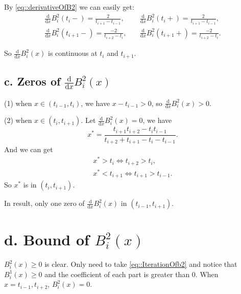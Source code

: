 \documentclass[a4paper]{article}
\begin{document}
By \eqref{eq::derivativeOfB2} we can easily get:
\begin{equation}
    \begin{aligned}
        \frac{\mathrm{d}}{\mathrm{d} x} B_i^2(t_i -) = \frac{2}{t_{i+1} - t_{i-1}},& \quad \frac{\mathrm{d}}{\mathrm{d} x} B_i^2(t_i +) = \frac{2}{t_{i+1} - t_{i-1}}, \\
        \frac{\mathrm{d}}{\mathrm{d} x} B_i^2(t_{i+1} -) = \frac{-2}{t_{i+2} - t_{i}},& \quad \frac{\mathrm{d}}{\mathrm{d} x} B_i^2(t_{i+1} +) = \frac{-2}{t_{i+2} - t_{i}}. 
    \end{aligned}
\end{equation}

So $\frac{\mathrm{d}}{\mathrm{d} x} B_i^2(x)$ is continuous at $t_i$ and $t_{i+1}$. 

\subsection*{c. Zeros of $\frac{\mathrm{d}}{\mathrm{d} x} B_i^2(x)$}

(1) when $x \in (t_{i-1}, t_{i})$, we have $x-t_{i-1} > 0$, so $\frac{\mathrm{d}}{\mathrm{d} x} B_i^2(x) > 0$.

(2) when $x \in (t_{i}, t_{i+1})$. Let $\frac{\mathrm{d}}{\mathrm{d} x} B_i^2(x) = 0$, we have
\begin{equation}
    x^* = \frac{t_{i+1} t_{i+2} - t_{i} t_{i-1}}{t_{i+2} + t_{i+1} - t_i - t_{i-1}}. 
\end{equation}
And we can get
\begin{equation}
    \begin{aligned}
        x^* > t_i \Leftrightarrow t_{i+2} > t_i, \\
        x^* < t_{i+1} \Leftrightarrow t_{i+1} > t_{i-1}. 
    \end{aligned}
\end{equation}
So $x^*$ is in $(t_i, t_{i+1})$. 

In result, only one zero of $\frac{\mathrm{d}}{\mathrm{d} x} B_i^2(x)$ in $(t_{i-1}, t_{i+1})$.

\section*{d. Bound of $B_i^2(x)$}

$B_i^2(x) \geq 0$ is clear. Only need to take \eqref{eq::IterationOfb2} and notice that $B_i^1(x) \geq 0$ and the coefficient of each part is greater than 0. When $x = t_{i-1}, t_{i+2}$, $B_i^2(x) = 0$. 
\end{document}
